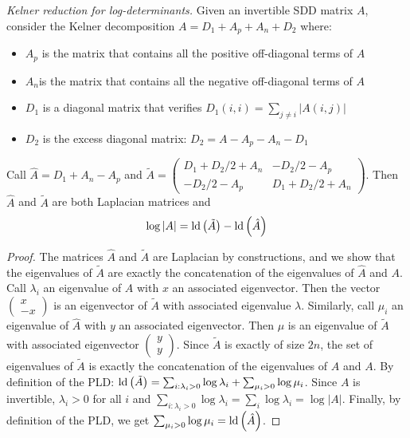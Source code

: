 \begin{lemma}\emph{Kelner reduction for log-determinants. }Given
an invertible SDD matrix $A$, consider the Kelner decomposition $A=D_{1}+A_{p}+A_{n}+D_{2}$
where:
\begin{itemize}
\item $A_{p}$ is the matrix that contains all the positive off-diagonal
terms of $A$
\item $A_{n}$is the matrix that contains all the negative off-diagonal
terms of $A$
\item $D_{1}$ is a diagonal matrix that verifies $D_{1}\left(i,i\right)=\sum_{j\neq i}\left|A\left(i,j\right)\right|$
\item $D_{2}$ is the excess diagonal matrix: $D_{2}=A-A_{p}-A_{n}-D_{1}$
\end{itemize}
Call $\hat{A}=D_{1}+A_{n}-A_{p}$ and $\tilde{A}=\left(\begin{array}{cc}
D_{1}+D_{2}/2+A_{n} & -D_{2}/2-A_{p}\\
-D_{2}/2-A_{p} & D_{1}+D_{2}/2+A_{n}
\end{array}\right)$. Then $\hat{A}$ and $\tilde{A}$ are both Laplacian matrices and
\[
\log\left|A\right|=\text{\textnormal{ld}}\left(\tilde{A}\right)-\text{\textnormal{ld}}\left(\hat{A}\right)
\]


\end{lemma}

\begin{proof}The matrices $\hat{A}$ and $\tilde{A}$ are Laplacian
by constructions, and we show that the eigenvalues of $\tilde{A}$
are exactly the concatenation of the eigenvalues of $\hat{A}$ and
$A$. Call $\lambda_{i}$ an eigenvalue of $A$ with $x$ an associated
eigenvector. Then the vector $\left(\begin{array}{c}
x\\
-x
\end{array}\right)$ is an eigenvector of $\tilde{A}$ with associated eigenvalue $\lambda$.
Similarly, call $\mu_{i}$ an eigenvalue of $\hat{A}$ with $y$ an
associated eigenvector. Then $\mu$ is an eigenvalue of $\tilde{A}$
with associated eigenvector $\left(\begin{array}{c}
y\\
y
\end{array}\right)$. Since $\tilde{A}$ is exactly of size $2n$, the set of eigenvalues
of $\tilde{A}$ is exactly the concatenation of the eigenvalues of
$\hat{A}$ and $A$. By definition of the PLD: $\text{\textnormal{ld}}\left(\tilde{A}\right)=\sum_{i:\lambda_{i}>0}\log\lambda_{i}+\sum_{\mu_{i}>0}\log\mu_{i}$.
Since $A$ is invertible, $\lambda_{i}>0$ for all $i$ and $\sum_{i:\lambda_{i}>0}\log\lambda_{i}=\sum_{i}\log\lambda_{i}=\log\left|A\right|$.
Finally, by definition of the PLD, we get $\sum_{\mu_{i}>0}\log\mu_{i}=\text{\textnormal{ld}}\left(\hat{A}\right)$.

\end{proof}

